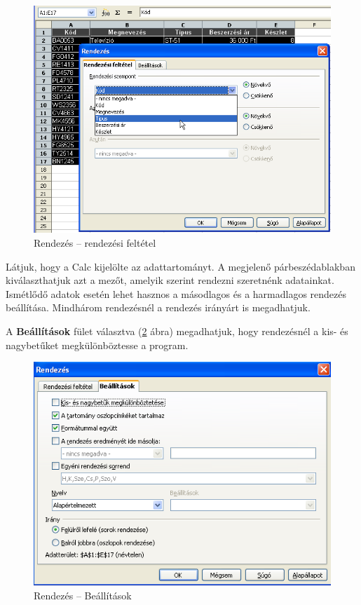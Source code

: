 \begin{figure}[!h]
\begin{center}
\includegraphics[width=15.999cm]{oocalcv1-img112.png}
\caption{Rendezés -- rendezési feltétel}\label{RendezésiFeltétel}
\end{center}
\end{figure}

Látjuk, hogy a Calc kijelölte az adattartományt. A megjelenő
párbeszédablakban kiválaszthatjuk azt a mezőt, amelyik
szerint rendezni szeretnénk adatainkat. Ismétlődő adatok
esetén lehet hasznos a másodlagos és a harmadlagos rendezés
beállítása. Mindhárom rendezésnél a rendezés irányárt
is megadhatjuk.

A \textbf{Beállítások} fület választva (\ref{RendezésBeállítások} ábra)
megadhatjuk, hogy rendezésnél a kis- és nagybetűket
megkülönböztesse a program.

\begin{figure}[!h]
\begin{center}
\includegraphics[width=12.864cm]{oocalcv1-img113.png}
\caption{Rendezés --  Beállítások}\label{RendezésBeállítások}
\end{center}
\end{figure}

